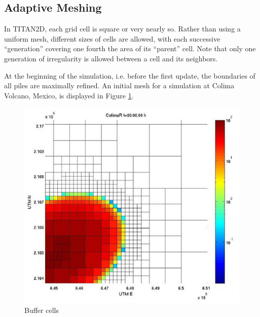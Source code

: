 \documentclass[letterpaper,10pt]{article}
\begin{document}
\subsection{Adaptive Meshing} \label{adaptivemeshing}
In   TITAN2D, each grid cell is square or very nearly so.  Rather than 
using a uniform mesh, different sizes of cells are allowed, with each 
successive ``generation'' covering one fourth the area of its ``parent'' 
cell.  Note that only one generation of irregularity is allowed between 
a cell and its neighbors.\newline

At the beginning of the simulation, i.e. before the first update, the 
boundaries of all piles are maximally refined. An initial mesh for a 
simulation at Colima Volcano, Mexico, is displayed in Figure \ref{bufcell}. 

\begin{figure}[!h]
	\begin{center}
		\includegraphics[scale=.3]{IMAGES/buffercells.png}
		\caption{Buffer cells}
		\label{bufcell}
	\end{center}
\end{figure} 
\end{document}
